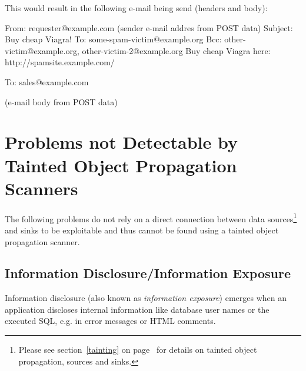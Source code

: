 This would result in the following e-mail being send (headers and body):

\begin{textcode}
From: requester@example.com (sender e-mail addres from POST data)
Subject: Buy cheap Viagra!
To: some-spam-victim@example.org
Bcc: other-victim@example.org, other-victim-2@example.org
Buy cheap Viagra here: http://spamsite.example.com/

To: sales@example.com

(e-mail body from POST data)
\end{textcode}



\section{Problems not Detectable by Tainted Object Propagation Scanners}
The following problems do not rely on a direct connection between data sources\footnote{Please see section~\ref{tainting} on page~\pageref{tainting} for details on tainted object propagation, sources and sinks.} and sinks to be exploitable and thus cannot be found using a tainted object propagation scanner.



\subsection{Information Disclosure/Information Exposure}
\label{information-disclosure}
Information disclosure (also known as \emph{information exposure}) emerges when an application discloses internal information like database user names or the executed SQL, e.g. in error messages or HTML comments.

